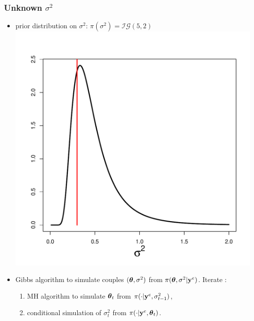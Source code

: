 \documentclass[nopagenumber,9pt]{beamer}
\begin{document}
\begin{frame}
 \frametitle{Unknown $\sigma^2$}
 
 \begin{itemize}
  \item  prior distribution on $\sigma^2$: $\pi(\sigma^2)=\mathcal{IG}(5,2)$\\
  \includegraphics[scale=.2]{priorsig2.pdf}
  \item Gibbs algorithm to simulate couples $(\boldsymbol{\theta},\sigma^2)$ from $\pi(\boldsymbol{\theta},\sigma^2|\mathbf{y}^{e})$.
  Iterate :
  \begin{enumerate}
   \item MH algorithm to simulate $\boldsymbol{\theta}_{t}$ from $\pi(\cdot|\mathbf{y}^{e},\sigma^2_{t-1})$,
   \item conditional simulation of $\sigma^2_{t}$ from $\pi(\cdot|\mathbf{y}^{e},\boldsymbol{\theta}_{t})$.
  \end{enumerate}

  \end{itemize}

 
\end{frame}
\end{document}
